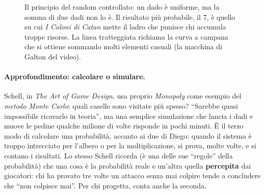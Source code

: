 \begin{figure}[htbp]
\centering
{}
\caption{Il principio del random controllato: un dado è uniforme, ma la somma di due dadi
non lo è. Il risultato più probabile, il 7, è quello su cui \emph{I Coloni di Catan} mette
il ladro che punisce chi accumula troppe risorse. La linea tratteggiata richiama la curva a
campana che si ottiene sommando molti elementi casuali (la macchina di Galton del video).}
\label{a15:fig:campana}
\end{figure}

\paragraph{Approfondimento: calcolare o simulare.} Schell, in \emph{The Art of Game Design},
usa proprio \emph{Monopoly} come esempio del \emph{metodo Monte Carlo}: quali caselle sono
visitate più spesso? ``Sarebbe quasi impossibile ricavarlo in teoria'', ma una semplice
simulazione che lancia i dadi e muove le pedine qualche milione di volte risponde in pochi
minuti. È il terzo modo di calcolare una probabilità, accanto ai due di Diego: quando il
sistema è troppo intrecciato per l'albero o per la moltiplicazione, si prova, molte volte,
e si contano i risultati. Lo stesso Schell ricorda (è una delle sue ``regole'' della
probabilità) che una cosa è la probabilità reale e un'altra quella \textbf{percepita} dai
giocatori: chi ha provato tre volte un attacco senza mai colpire tende a concludere che
``non colpisce mai''. Per chi progetta, conta anche la seconda.

